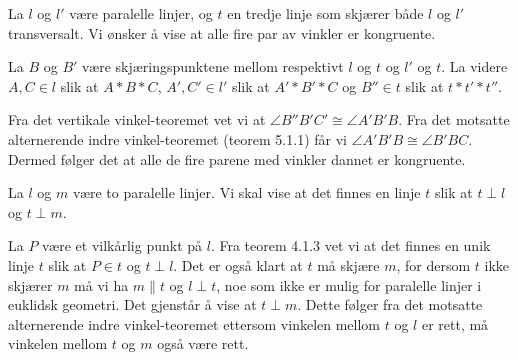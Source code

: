 

\begin{oppgave}[5.1.1]
    La $l$ og $l'$ være paralelle linjer, og $t$ en tredje linje som skjærer både $l$ og $l'$ transversalt. 
    Vi ønsker å vise at alle fire par av vinkler er kongruente. 

    La $B$ og $B'$ være skjæringspunktene mellom respektivt $l$ og $t$ og $l'$ og $t$. 
    La videre $A, C\in l$ slik at $A\ast B\ast C$, $A', C'\in l'$ slik at $A'\ast B'\ast C$ og $B''\in t$ slik at $t\ast t'\ast t''$. 

    \begin{figure}[H]
        \centering
         
    \end{figure}

    Fra det vertikale vinkel-teoremet vet vi at $\angle B''B'C'\cong \angle A'B'B$. 
    Fra det motsatte alternerende indre vinkel-teoremet (teorem 5.1.1) får vi $\angle A'B'B\cong \angle B'BC$.
    Dermed følger det at alle de fire parene med vinkler dannet er kongruente. 
\end{oppgave}

\begin{oppgave}[5.1.9]
    La $l$ og $m$ være to paralelle linjer. 
    Vi skal vise at det finnes en linje $t$ slik at $t\perp l$ og $t\perp m$. 
    
    La $P$ være et vilkårlig punkt på $l$. 
    Fra teorem 4.1.3 vet vi at det finnes en unik linje $t$ slik at $P\in t$ og $t\perp l$.
    Det er også klart at $t$ må skjære $m$, for dersom $t$ ikke skjærer $m$ må vi ha $m\parallel t$ og $l\perp t$, noe som ikke er mulig for paralelle linjer i euklidsk geometri.
    Det gjenstår å vise at $t\perp m$. 
    Dette følger fra det motsatte alternerende indre vinkel-teoremet ettersom vinkelen mellom $t$ og $l$ er rett, må vinkelen mellom $t$ og $m$ også være rett. 
\end{oppgave}

